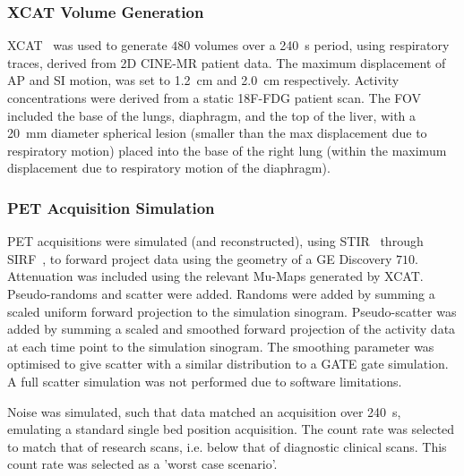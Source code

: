             \subsubsection{XCAT Volume Generation} \label{sec:xcat_volume_generation}
                \gls{XCAT}~\parencite{Segars2010} was used to generate $480$ volumes over a \SI{240}{\second} period, using respiratory traces, derived from \gls{2D} CINE-\gls{MR} patient data. The maximum displacement of \gls{AP} and \gls{SI} motion, was set to \SI{1.2}{\centi\metre} and \SI{2.0}{\centi\metre} respectively. Activity concentrations were derived from a static \gls{18F-FDG} patient scan. The \gls{FOV} included the base of the lungs, diaphragm, and the top of the liver, with a \SI{20}{\milli\metre} diameter spherical lesion (smaller than the max displacement due to respiratory motion) placed into the base of the right lung (within the maximum displacement due to respiratory motion of the diaphragm).
            
            \subsubsection{PET Acquisition Simulation} \label{sec:pet_ct_motion_correction_exploiting_motion_models_fit_on_coarsely_gated_data_applied_to_finely_gated_data_methods_pet_acquisition_simulation}
                \gls{PET} acquisitions were simulated (and reconstructed), using \gls{STIR}~\parencite{Thielemans2012, Nikos2019} through \gls{SIRF}~\parencite{Ovtchinnikov2017}, to forward project data using the geometry of a \gls{GE} Discovery $710$. Attenuation was included using the relevant \glspl{Mu-Map} generated by \gls{XCAT}. Pseudo-randoms and scatter were added. Randoms were added by summing a scaled uniform forward projection to the simulation sinogram. Pseudo-scatter was added by summing a scaled and smoothed forward projection of the activity data at each time point to the simulation sinogram. The smoothing parameter was optimised to give scatter with a similar distribution to a GATE gate simulation. A full scatter simulation was not performed due to software limitations.
                
                Noise was simulated, such that data matched an acquisition over \SI{240}{\second}, emulating a standard single bed position acquisition. The count rate was selected to match that of research scans, i.e. below that of diagnostic clinical scans. This count rate was selected as a 'worst case scenario'.
                
